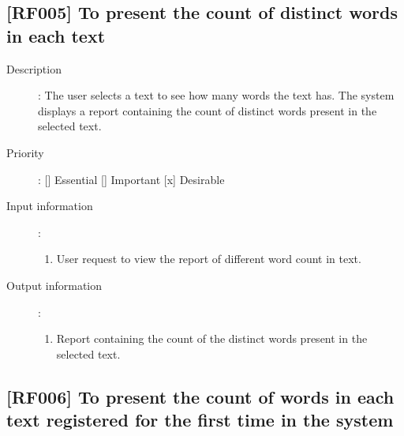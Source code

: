 \documentclass[11pt, twoside, a4paper]{book}
\begin{document}
			\subsection{[RF005] To present the count of distinct words in each text}
				
				\begin{description}
				
					\item[Description]: The user selects a text to see how many words the text has. The system displays a report containing the count of distinct words present in the selected text.
					\item[Priority]: [] Essential [] Important [x] Desirable
					\item[Input information]:
						\begin{enumerate}

							\item User request to view the report of different word count in text.
							
						\end{enumerate}
					\item[Output information]:
						\begin{enumerate}
						
							\item Report containing the count of the distinct words present in the selected text.
																					
						\end{enumerate}
	
				\end{description}

			\subsection{[RF006] To present the count of words in each text registered for the first time in the system}
				
\end{document}
